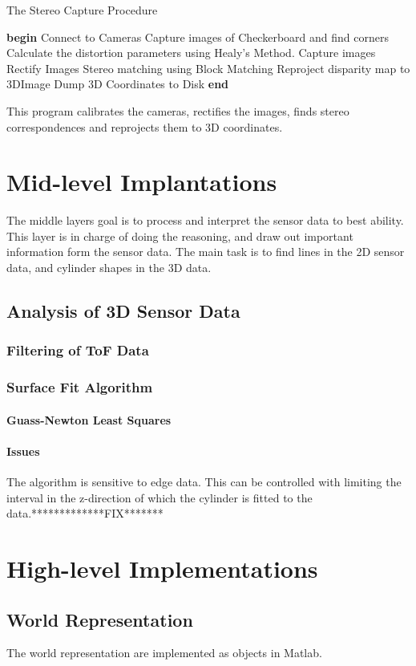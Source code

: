 \begin{algorithm}
\caption{The Stereo Capture Procedure}
\label{chap6:alg-stereomatch}
    \begin{algorithmic}
    \STATE \textbf{begin}
    \STATE Connect to Cameras
        \STATE Capture images of Checkerboard and find corners
    \ENDFOR
    \STATE Calculate the distortion parameters using Healy's Method.
        \STATE Capture images
        \STATE Rectify Images
        \STATE Stereo matching using Block Matching 
        \STATE Reproject disparity map to 3DImage
        \STATE Dump 3D Coordinates to Disk
    \ENDWHILE
    \STATE \textbf{end}
    \end{algorithmic}
\end{algorithm}
This program calibrates the cameras, rectifies the images, finds stereo correspondences
and reprojects them to 3D coordinates.


\section{Mid-level Implantations}
The middle layers goal is to process and interpret the sensor data to best ability. This
layer is in charge of doing the reasoning, and draw out important information form the
sensor data. The main task is to find lines in the 2D sensor data, and cylinder shapes in
the 3D data. 

\subsection{Analysis of 3D Sensor Data}



\subsubsection{Filtering of ToF Data}


\subsubsection{Surface Fit Algorithm}


\paragraph{Guass-Newton Least Squares}


\paragraph{Issues}
The algorithm is sensitive to edge data. This can be controlled with limiting the interval
in the z-direction of which the cylinder is fitted to the data.*************FIX*******


\section{High-level Implementations}

\subsection{World Representation}
The world representation are implemented as objects in Matlab.




